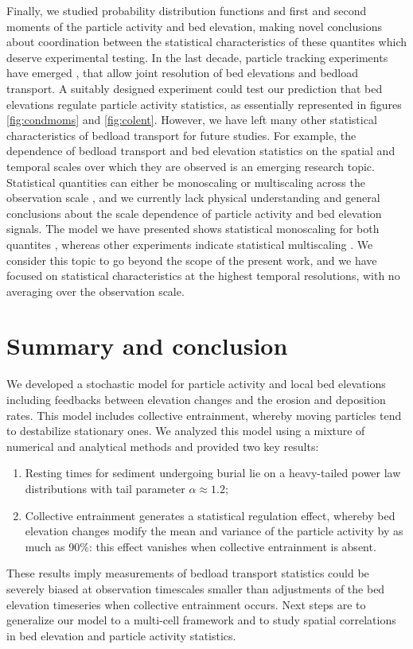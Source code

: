 Finally, we studied probability distribution functions and first and second moments of the particle activity and bed elevation, making novel conclusions about coordination between the statistical characteristics of these quantites which deserve experimental testing.
In the last decade, particle tracking experiments have emerged \citep{Lajeunesse2010,Roseberry2012,Martin2014, Fathel2015,Heyman2016,Liu2019}, that allow joint resolution of bed elevations and bedload transport. 
A suitably designed experiment could test our prediction that bed elevations regulate particle activity statistics, as essentially represented in figures \ref{fig:condmoms} and \ref{fig:colent}. 
However, we have left many other statistical characteristics of bedload transport for future studies. 
For example, the dependence of bedload transport \citep{Saletti2015,Singh2009} and bed elevation statistics \citep{Aberle2006, Singh2009,Singh2012} on the spatial and temporal scales over which they are observed is an emerging research topic. Statistical quantities can either be monoscaling or multiscaling across the observation scale \citep{Sornette2006}, and we currently lack physical understanding and general conclusions about the scale dependence of particle activity and bed elevation signals.
The model we have presented shows statistical monoscaling for both quantites \citep[e.g.][]{Saletti2015}, whereas other experiments indicate statistical multiscaling \citep{Aberle2006,Singh2009,Singh2012}. We consider this topic to go beyond the scope of the present work, and we have focused on statistical characteristics at the highest temporal resolutions, with no averaging over the observation scale.

\section{Summary and conclusion}
\label{sec:conclusion}

We developed a stochastic model for particle activity and local bed elevations including feedbacks between elevation changes and the erosion and deposition rates.
This model includes collective entrainment, whereby moving particles tend to destabilize stationary ones.
We analyzed this model using a mixture of numerical and analytical methods and provided two key results:
\begin{enumerate}
	\item Resting times for sediment undergoing burial lie on a heavy-tailed power law distributions with tail parameter $\alpha \approx 1.2$;
	\item Collective entrainment generates a statistical regulation effect, whereby bed elevation changes modify the mean and variance of the particle activity by as much as 90\%: this effect vanishes when collective entrainment is absent.
\end{enumerate}
These results imply measurements of bedload transport statistics could be severely biased at observation timescales smaller than adjustments of the bed elevation timeseries when collective entrainment occurs.
Next steps are to generalize our model to a multi-cell framework and to study spatial correlations in bed elevation and particle activity statistics.
